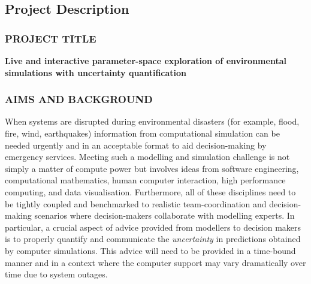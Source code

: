 \documentclass[a4paper,fontsize=12pt]{scrartcl}
\author{}
\date{\today}
\begin{document}
\renewcommand{\thesection}{\Alph{section}}

\setcounter{section}{3} %
\subsection{Project Description}
\label{sec:project-description}

\subsubsection*{PROJECT TITLE}

\textbf{Live and interactive parameter-space exploration of environmental simulations with uncertainty quantification} %



\subsubsection*{AIMS AND BACKGROUND}



When systems are disrupted during environmental disasters (for example,
flood, fire, wind, earthquakes) information from
computational simulation can be needed urgently and in an
acceptable format to aid  decision-making by emergency services. 
Meeting such a modelling and simulation 
challenge is not simply a matter of compute power but involves
ideas from software engineering, computational mathematics,
human computer interaction, high performance computing, and data visualisation. Furthermore, all
of these disciplines need to be tightly coupled and benchmarked to
realistic  team-coordination and decision-making scenarios where decision-makers collaborate with modelling experts. 
In particular, 
a crucial aspect of advice provided from modellers to decision makers is to properly quantify and communicate 
the {\em uncertainty} in predictions obtained
by computer simulations. This advice will need to be provided in a time-bound manner and in a context where the computer support may vary dramatically over time due to system outages.
\end{document}
